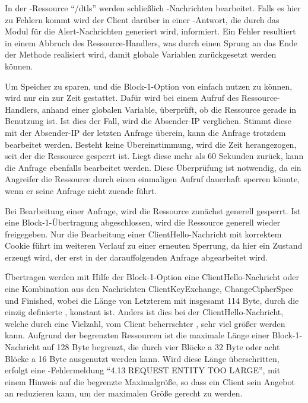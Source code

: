 In der -Ressource "`/dtls"' werden schließlich -Nachrichten bearbeitet. Falls es hier zu Fehlern kommt wird der Client darüber in einer
-Antwort, die durch das Modul für die Alert-Nachrichten generiert wird, informiert. Ein Fehler resultiert in einem Abbruch des Ressource-Handlers,
was durch einen Sprung an das Ende der Methode realisiert wird, damit globale Variablen zurückgesetzt werden können.

Um Speicher zu sparen, und die Block-1-Option von  einfach nutzen zu können, wird nur ein  zur Zeit gestattet. Dafür wird bei einem Aufruf des
Ressource-Handlers, anhand einer globalen Variable, überprüft, ob die Ressource gerade in Benutzung ist. Ist dies der Fall, wird die Absender-IP verglichen.
Stimmt diese mit der Absender-IP der letzten Anfrage überein, kann die Anfrage trotzdem bearbeitet werden. Besteht keine Übereinstimmung, wird die Zeit herangezogen,
seit der die Ressource gesperrt ist. Liegt diese mehr als 60 Sekunden zurück, kann die Anfrage ebenfalls bearbeitet werden. Diese Überprüfung ist notwendig, da
ein Angreifer die Ressource durch einen einmaligen Aufruf dauerhaft sperren könnte, wenn er seine Anfrage nicht zuende führt.

Bei Bearbeitung einer Anfrage, wird die Ressource zunächst generell gesperrt. Ist eine Block-1-Übertragung abgeschlossen, wird die Ressource generell wieder freigegeben.
Nur die Bearbeitung einer ClientHello-Nachricht mit korrektem Cookie führt im weiteren Verlauf zu einer erneuten Sperrung, da hier ein Zustand erzeugt wird, der erst
in der darauffolgenden Anfrage abgearbeitet wird.

Übertragen werden mit Hilfe der Block-1-Option eine ClientHello-Nachricht oder eine Kombination aus den Nachrichten ClientKeyExchange, ChangeCipherSpec und Finished,
wobei die Länge von Letzterem mit insgesamt 114 Byte, durch die einzig definierte , konstant ist. Anders ist dies bei der ClientHello-Nachricht,
welche durch eine Vielzahl, vom Client beherrschter , sehr viel größer werden kann. Aufgrund der begrenzten Ressourcen ist die maximale Länge einer
Block-1-Nachricht auf 128 Byte begrenzt, die durch vier Blöcke a 32 Byte oder acht Blöcke a 16 Byte ausgenutzt werden kann. Wird diese Länge überschritten, erfolgt
eine -Fehlermeldung "`4.13 REQUEST ENTITY TOO LARGE"', mit einem Hinweis auf die begrenzte Maximalgröße, so dass ein Client sein Angebot an 
reduzieren kann, um der maximalen Größe gerecht zu werden.

